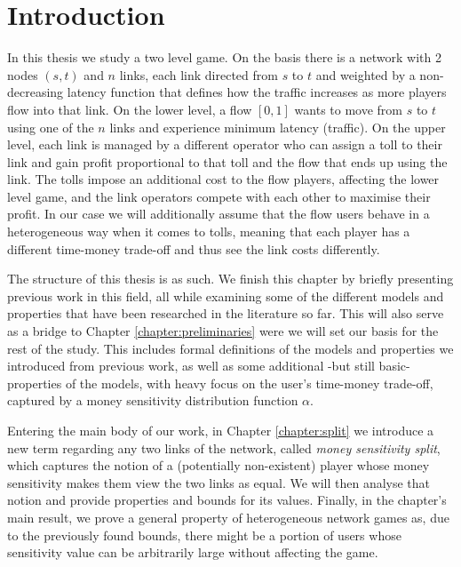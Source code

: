 \documentclass[10pt,a4paper]{book}
\theoremstyle{definition}
\theoremstyle{comment}
\begin{document}
\clearpage

\thispagestyle{empty}
\null
\clearpage

\pagestyle{fancy}

\tableofcontents
\clearpage

\thispagestyle{empty}
\null
\clearpage



\chapter{Introduction}
\label{chapter:intro}

In this thesis we study a two level game.
On the basis there is a network with 2 nodes $(s, t)$ and $n$ links, each link directed from $s$ to $t$ and weighted by a non-decreasing latency function that defines how the traffic increases as more players flow into that link.
On the lower level, a flow $[0, 1]$ wants to move from $s$ to $t$ using one of the $n$ links and experience minimum latency (traffic).
On the upper level, each link is managed by a different operator who can assign a toll to their link and gain profit proportional to that toll and the flow that ends up using the link.
The tolls impose an additional cost to the flow players, affecting the lower level game, and the link operators compete with each other to maximise their profit.
In our case we will additionally assume that the flow users behave in a heterogeneous way when it comes to tolls, meaning that each player has a different time-money trade-off and thus see the link costs differently.

The structure of this thesis is as such.
We finish this chapter by briefly presenting previous work in this field, all while examining some of the different models and properties that have been researched in the literature so far.
This will also serve as a bridge to Chapter \ref{chapter:preliminaries} were we will set our basis for the rest of the study.
This includes formal definitions of the models and properties we introduced from previous work, as well as some additional -but still basic- properties of the models, with heavy focus on the user's time-money trade-off, captured by a money sensitivity distribution function $\alpha$.

Entering the main body of our work, in Chapter \ref{chapter:split} we introduce a new term regarding any two links of the network, called \textit{money sensitivity split}, which captures the notion of a (potentially non-existent) player whose money sensitivity makes them view the two links as equal.
We will then analyse that notion and provide properties and bounds for its values.
Finally, in the chapter's main result, we prove a general property of heterogeneous network games as, due to the previously found bounds, there might be a portion of users whose sensitivity value can be arbitrarily large without affecting the game.
\end{document}
